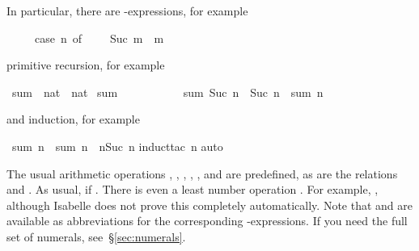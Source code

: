 %
\begin{isabellebody}%
\def\isabellecontext{natsum}%
%
\begin{isamarkuptext}%
\noindent
In particular, there are -expressions, for example
\begin{isabelle}%
\ \ \ \ \ case\ n\ of\ {}\ {\isasymRightarrow}\ {}\ {\isacharbar}\ Suc\ m\ {\isasymRightarrow}\ m%
\end{isabelle}
primitive recursion, for example%
\end{isamarkuptext}%
\ sum\ {\isacharcolon}{\isacharcolon}\ {\isachardoublequote}nat\ {\isasymRightarrow}\ nat{\isachardoublequote}\isanewline
{}\ {\isachardoublequote}sum\ {}\ {\isacharequal}\ {}{\isachardoublequote}\isanewline
\ \ \ \ \ \ \ \ {\isachardoublequote}sum\ {\isacharparenleft}Suc\ n{\isacharparenright}\ {\isacharequal}\ Suc\ n\ {\isacharplus}\ sum\ n{\isachardoublequote}%
\begin{isamarkuptext}%
\noindent
and induction, for example%
\end{isamarkuptext}%
\ {\isachardoublequote}sum\ n\ {\isacharplus}\ sum\ n\ {\isacharequal}\ n{\isacharasterisk}{\isacharparenleft}Suc\ n{\isacharparenright}{\isachardoublequote}\isanewline
{}induct{\isacharunderscore}tac\ n{\isacharparenright}\isanewline
{}auto{\isacharparenright}\isanewline
{}%
\begin{isamarkuptext}%
\newcommand{\mystar}{*%
}
The usual arithmetic operations ,
, \ttindexboldpos{\mystar}{$HOL2arithfun},
, ,  and
 are predefined, as are the relations
 and
. As usual,  if
. There is even a least number operation
. For example, , although
Isabelle does not prove this completely automatically. Note that 
and  are available as abbreviations for the corresponding
-expressions. If you need the full set of numerals,
see~\S\ref{sec:numerals}.


\end{isamarkuptext}
\end{isabellebody}
